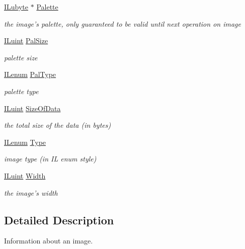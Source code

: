 \begin{DoxyCompactItemize}
\hyperlink{group__il__types_ga057357939bc5a12e8061715453568519}{I\+Lubyte} $\ast$ \hyperlink{struct_i_l_uinfo_ab520cff305ed9ee13d2eac7a87ac1d92}{Palette}
\begin{DoxyCompactList}\small\item\em the image's palette, only guaranteed to be valid until next operation on image \end{DoxyCompactList}\item 
\hyperlink{group__il__types_gaff8e86a1072c8d7cfe387fb87c6ed8e1}{I\+Luint} \hyperlink{struct_i_l_uinfo_a728a63d4c8b857a800a4d19e250a8c4b}{Pal\+Size}
\begin{DoxyCompactList}\small\item\em palette size \end{DoxyCompactList}\item 
\hyperlink{group__il__types_ga62ca73445716183ef42b1f3906a45ed0}{I\+Lenum} \hyperlink{struct_i_l_uinfo_ab091aab8d79003031a4e9957e85f43ca}{Pal\+Type}
\begin{DoxyCompactList}\small\item\em palette type \end{DoxyCompactList}\item 
\hyperlink{group__il__types_gaff8e86a1072c8d7cfe387fb87c6ed8e1}{I\+Luint} \hyperlink{struct_i_l_uinfo_ad3bfe4c8a6696b42835730f7b70327b7}{Size\+Of\+Data}
\begin{DoxyCompactList}\small\item\em the total size of the data (in bytes) \end{DoxyCompactList}\item 
\hyperlink{group__il__types_ga62ca73445716183ef42b1f3906a45ed0}{I\+Lenum} \hyperlink{struct_i_l_uinfo_a437e4fc3b579e2e7879dedd0fd2ac587}{Type}
\begin{DoxyCompactList}\small\item\em image type (in I\+L enum style) \end{DoxyCompactList}\item 
\hyperlink{group__il__types_gaff8e86a1072c8d7cfe387fb87c6ed8e1}{I\+Luint} \hyperlink{struct_i_l_uinfo_a4146e7b2b0b4097e0e335f9b348392bf}{Width}
\begin{DoxyCompactList}\small\item\em the image's width \end{DoxyCompactList}\end{DoxyCompactItemize}


\subsection{Detailed Description}
Information about an image. 

